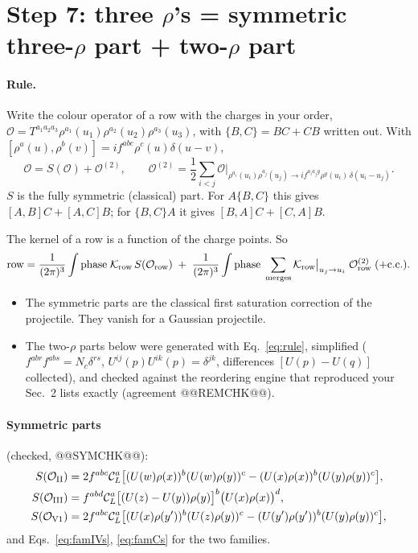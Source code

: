 \documentclass[10pt]{article}
\numberwithin{equation}{section}
\newcommand{\CL}{\mathcal C_L}
\newcommand{\OO}{\mathcal O}
\newcommand{\KK}{\mathcal K}
\newcommand{\pre}{\frac{1}{(2\pi)^3}}
\begin{document}
\section{Step 7: three \texorpdfstring{$\rho$}{rho}'s = symmetric three-\texorpdfstring{$\rho$}{rho} part + two-\texorpdfstring{$\rho$}{rho} part}\label{sec:three}
\paragraph{Rule.} Write the colour operator of a row with the charges in your order, $\OO=T^{a_1a_2a_3}\rho^{a_1}(u_1)\rho^{a_2}(u_2)\rho^{a_3}(u_3)$, with $\{B,C\}=BC+CB$ written out. With $[\rho^a(u),\rho^b(v)]=if^{abc}\rho^c(u)\delta(u-v)$,
\begin{equation}
\OO=S(\OO)+\OO^{(2)},\qquad\OO^{(2)}=\frac12\sum_{i<j}\OO\Big|_{\rho^{a_i}(u_i)\rho^{a_j}(u_j)\to if^{a_ia_jg}\rho^g(u_i)\,\delta(u_i-u_j)}.
\label{eq:rule}
\end{equation}
$S$ is the fully symmetric (classical) part. For $A\{B,C\}$ this gives $[A,B]C+[A,C]B$; for $\{B,C\}A$ it gives $[B,A]C+[C,A]B$.

The kernel of a row is a function of the charge points. So
\begin{equation*}
\text{row}=\pre\int\text{phase}\;\KK_{\rm row}\,S(\OO_{\rm row})\;+\;\pre\int\text{phase}\;\sum_{\rm merges}\KK_{\rm row}\big|_{u_j\to u_i}\;\OO^{(2)}_{\rm row}\;(+{\rm c.c.}).
\end{equation*}
\begin{itemize}
\item The symmetric parts are the classical first saturation correction of the projectile. They vanish for a Gaussian projectile.
\item The two-$\rho$ parts below were generated with Eq.~\eqref{eq:rule}, simplified ($f^{abr}f^{abs}=N_c\delta^{rs}$, $U^{ij}(p)U^{ik}(p)=\delta^{jk}$, differences $[U(p)-U(q)]$ collected), and checked against the reordering engine that reproduced your Sec.~2 lists exactly (agreement @@REMCHK@@).
\end{itemize}
\paragraph{Symmetric parts} (checked, @@SYMCHK@@):
\begin{align*}
S(\OO_{\rm II})&=2f^{abc}\CL^a\big[(U(w)\rho(x))^b(U(w)\rho(y))^c-(U(x)\rho(x))^b(U(y)\rho(y))^c\big],\\
S(\OO_{\rm III})&=f^{abd}\CL^a\big[(U(z)-U(y))\rho(y)\big]^b\big(U(x)\rho(x)\big)^d,\\
S(\OO_{\rm V1})&=2f^{abc}\CL^a\big[(U(x)\rho(y'))^b(U(z)\rho(y))^c-(U(y')\rho(y'))^b(U(y)\rho(y))^c\big],
\end{align*}
and Eqs.~\eqref{eq:famIVs}, \eqref{eq:famCs} for the two families.
\end{document}
